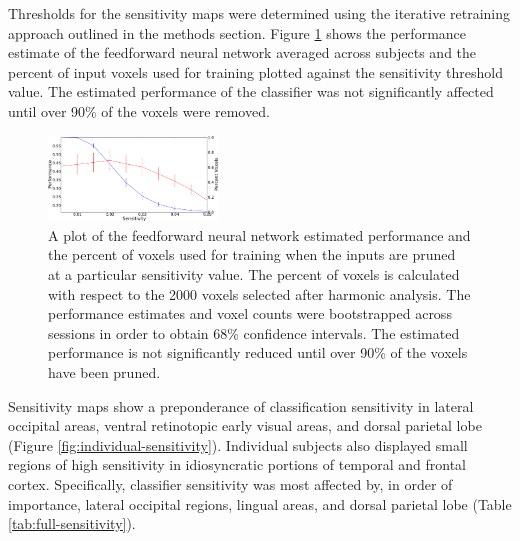 \documentclass[preprint,5p,authoryear]{elsarticle}
\begin{document}
Thresholds for the sensitivity maps were determined using the iterative retraining approach outlined in the methods section.
Figure \ref{fig:sensitivity-cutoff} shows the performance estimate of the feedforward neural network averaged across subjects and the percent of input voxels used for training plotted against the sensitivity threshold value.
The estimated performance of the classifier was not significantly affected until over 90\% of the voxels were removed.

\begin{figure}
\centering
\includegraphics[width=0.4\textwidth]{figures/performance-verse-sensitivity-cutoff}
\caption{A plot of the feedforward neural network estimated performance and the percent of voxels used for training when the inputs are pruned at a particular sensitivity value.
The percent of voxels is calculated with respect to the 2000 voxels selected after harmonic analysis.
The performance estimates and voxel counts were bootstrapped across sessions in order to obtain 68\% confidence intervals.
The estimated performance is not significantly reduced until over 90\% of the voxels have been pruned.}
\label{fig:sensitivity-cutoff}
\end{figure}

Sensitivity maps show a preponderance of classification sensitivity in
lateral occipital areas, ventral retinotopic early visual areas, and dorsal parietal lobe (Figure \ref{fig:individual-sensitivity}). 
Individual subjects also displayed small regions of high sensitivity in idiosyncratic portions of temporal and frontal cortex. 
Specifically, classifier sensitivity was most affected by, in order of importance, lateral occipital regions, lingual areas, and dorsal parietal lobe (Table \ref{tab:full-sensitivity}). 
\end{document}
